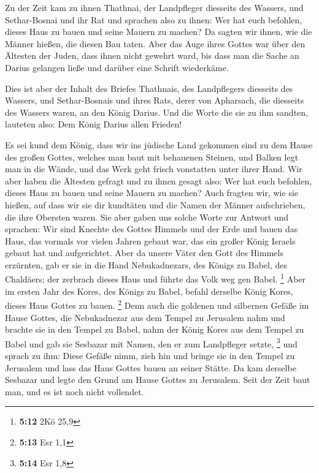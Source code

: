  Zu der Zeit kam zu ihnen Thathnai, der Landpfleger
diesseits des Wassers, und Sethar-Bosnai und ihr Rat und sprachen also
zu ihnen: Wer hat euch befohlen, dieses Haus zu bauen und seine Mauern
zu machen?  Da sagten wir ihnen, wie die Männer hießen,
die diesen Bau taten.  Aber das Auge ihres Gottes war über
den Ältesten der Juden, dass ihnen nicht gewehrt ward, bis dass man die
Sache an Darius gelangen ließe und darüber eine Schrift wiederkäme.

 Dies ist aber der Inhalt des Briefes Thathnais, des
Landpflegers diesseits des Wassers, und Sethar-Bosnais und ihres Rats,
derer von Apharsach, die diesseits des Wassers waren, an den König
Darius.  Und die Worte die sie zu ihm sandten, lauteten
also: Dem König Darius allen Frieden!

 Es sei kund dem König, dass wir ins jüdische Land
gekommen sind zu dem Hause des großen Gottes, welches man baut mit
behauenen Steinen, und Balken legt man in die Wände, und das Werk geht
frisch vonstatten unter ihrer Hand.  Wir aber haben die
Ältesten gefragt und zu ihnen gesagt also: Wer hat euch befohlen, dieses
Haus zu bauen und seine Mauern zu machen?  Auch fragten
wir, wie sie hießen, auf dass wir sie dir kundtäten und die Namen der
Männer aufschrieben, die ihre Obersten waren.  Sie aber
gaben uns solche Worte zur Antwort und sprachen: Wir sind Knechte des
Gottes Himmels und der Erde und bauen das Haus, das vormals vor vielen
Jahren gebaut war, das ein großer König Israels gebaut hat und
aufgerichtet.  Aber da unsere Väter den Gott des Himmels
erzürnten, gab er sie in die Hand Nebukadnezars, des Königs zu Babel,
des Chaldäers; der zerbrach dieses Haus und führte das Volk weg gen
Babel. \footnote{\textbf{5:12} 2Kö 25,9}  Aber im ersten
Jahr des Kores, des Königs zu Babel, befahl derselbe König Kores, dieses
Haus Gottes zu bauen. \footnote{\textbf{5:13} Esr 1,1} 
Denn auch die goldenen und silbernen Gefäße im Hause Gottes, die
Nebukadnezar aus dem Tempel zu Jerusalem nahm und brachte sie in den
Tempel zu Babel, nahm der König Kores aus dem Tempel zu Babel und gab
sie Sesbazar mit Namen, den er zum Landpfleger setzte, \footnote{\textbf{5:14}
  Esr 1,8}  und sprach zu ihm: Diese Gefäße nimm, zieh
hin und bringe sie in den Tempel zu Jerusalem und lass das Haus Gottes
bauen an seiner Stätte.  Da kam derselbe Sesbazar und
legte den Grund am Hause Gottes zu Jerusalem. Seit der Zeit baut man,
und es ist noch nicht vollendet.

